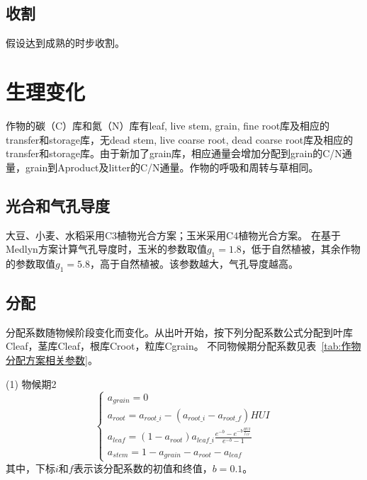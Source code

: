 \subsection{收割}
  假设达到成熟的时步收割。


\section{生理变化}
作物的碳（C）库和氮（N）库有leaf, live stem, grain, fine root库及相应的transfer和storage库，无dead stem, live coarse root, dead coarse root库及相应的transfer和storage库。由于新加了grain库，相应通量会增加分配到grain的C/N通量，grain到Aproduct及litter的C/N通量。作物的呼吸和周转与草相同。

\subsection{光合和气孔导度}
大豆、小麦、水稻采用C3植物光合方案；玉米采用C4植物光合方案。
在基于Medlyn方案计算气孔导度时，玉米的参数取值$g_1=1.8$，低于自然植被，其余作物的参数取值$g_1=5.8$，高于自然植被。该参数越大，气孔导度越高。

\subsection{分配}
分配系数随物候阶段变化而变化。从出叶开始，按下列分配系数公式分配到叶库Cleaf，茎库Cleaf，根库Croot，粒库Cgrain。
不同物候期分配系数见表~\ref{tab:作物分配方案相关参数}。

(1)	物候期2 \\
\begin{equation}
\left\{\begin{array}{c}
  a_{grain}=0 \\ 
  a_{root}=a_{root\_i}-\left(a_{root\_i}-a_{root\_f}\right) HUI \\
  a_{leaf}=\left(1-a_{root}\right) a_{leaf\_i} \frac{{e}^{-{b}}-{e}^{-b \frac{HUI}{f_{GF}}}}{{e}^{-{b}}-1}   \\
  a_{stem}=1-a_{grain}-a_{root}-a_{leaf}
  \end{array}\right.
\end{equation}
其中，下标$i$和$f$表示该分配系数的初值和终值，$b=0.1$。

